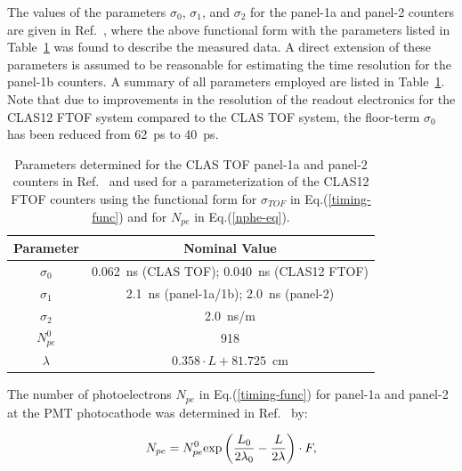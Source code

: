\documentclass[final,3p,twocolumn]{elsarticle}
\begin{document}
The values of the parameters $\sigma_0$, $\sigma_1$, and $\sigma_2$ for the panel-1a and panel-2
counters are given in Ref.~\cite{tof-nim}, where the above functional form with the parameters listed
in Table~\ref{timing-parms} was found to describe the measured data. A direct extension of these
parameters is assumed to be reasonable for estimating the time resolution for the panel-1b counters.
A summary of all parameters employed are listed in Table~\ref{timing-parms}. Note that due to
improvements in the resolution of the readout electronics for the CLAS12 FTOF system compared to
the CLAS TOF system, the floor-term $\sigma_0$ has been reduced from 62~ps to 40~ps. 

\begin{table}[htbp]
\begin{center}
\begin{tabular} {c|c} \hline
Parameter    & Nominal Value\\ \hline
$\sigma_0$ & 0.062~ns (CLAS TOF); 0.040~ns (CLAS12 FTOF) \\ \hline
$\sigma_1$  & 2.1~ns (panel-1a/1b); 2.0~ns (panel-2) \\ \hline
$\sigma_2$  & 2.0~ns/m \\ \hline
$N_{pe}^0$   & 918 \\ \hline
$\lambda$   & $0.358\cdot L + 81.725$~cm \\ \hline
\end{tabular}
\caption{Parameters determined for the CLAS TOF panel-1a and panel-2 counters in Ref.~\cite{tof-nim}
and used for a parameterization of the CLAS12 FTOF counters using the functional form for $\sigma_{TOF}$
in Eq.(\ref{timing-func}) and for $N_{pe}$ in Eq.(\ref{nphe-eq}).}
\label{timing-parms}
\end{center}
\end{table}

The number of photoelectrons $N_{pe}$ in Eq.(\ref{timing-func}) for panel-1a and panel-2 at the PMT
photocathode was determined in Ref.~\cite{tof-nim} by:

\begin{equation}
\label{nphe-eq}
N_{pe} = N_{pe}^0 {\rm exp} \left( \frac{L_0}{2 \lambda_0} - \frac{L}{2 \lambda} \right) \cdot F,
\end{equation}
\end{document}
